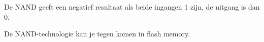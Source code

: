 De NAND geeft een negatief resultaat als beide ingangen 1 zijn, de uitgang is dan 0.

De NAND-technologie kan je tegen komen in flash memory.


